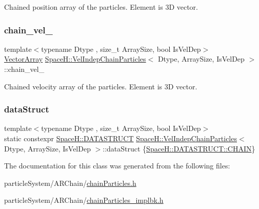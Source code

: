 Chained position array of the particles. Element is 3D vector. 

\mbox{\label{class_space_h_1_1_vel_indep_chain_particles_a79106719ec89861a02086b0a52eced21}} 
\subsubsection{\texorpdfstring{chain\+\_\+vel\+\_\+}{chain\_vel\_}}
{\footnotesize\ttfamily template$<$typename Dtype , size\+\_\+t Array\+Size, bool Is\+Vel\+Dep$>$ \\
\mbox{\hyperlink{class_space_h_1_1_vel_indep_particles_aa9983058940249df8b00fa800e8cbad2}{Vector\+Array}} \mbox{\hyperlink{class_space_h_1_1_vel_indep_chain_particles}{Space\+H\+::\+Vel\+Indep\+Chain\+Particles}}$<$ Dtype, Array\+Size, Is\+Vel\+Dep $>$\+::chain\+\_\+vel\+\_\+\hspace{0.3cm}{\ttfamily [protected]}}



Chained velocity array of the particles. Element is 3D vector. 

\mbox{\label{class_space_h_1_1_vel_indep_chain_particles_acf17d83713bb3f519dc1323418343375}} 
\subsubsection{\texorpdfstring{data\+Struct}{dataStruct}}
{\footnotesize\ttfamily template$<$typename Dtype , size\+\_\+t Array\+Size, bool Is\+Vel\+Dep$>$ \\
static constexpr \mbox{\hyperlink{namespace_space_h_a4782f089179a3c269891f02482b072df}{Space\+H\+::\+D\+A\+T\+A\+S\+T\+R\+U\+CT}} \mbox{\hyperlink{class_space_h_1_1_vel_indep_chain_particles}{Space\+H\+::\+Vel\+Indep\+Chain\+Particles}}$<$ Dtype, Array\+Size, Is\+Vel\+Dep $>$\+::data\+Struct \{\mbox{\hyperlink{namespace_space_h_a4782f089179a3c269891f02482b072dfa014d2cf3cdc3af6f4f92c09190860e33}{Space\+H\+::\+D\+A\+T\+A\+S\+T\+R\+U\+C\+T\+::\+C\+H\+A\+IN}}\}\hspace{0.3cm}{\ttfamily [static]}}



The documentation for this class was generated from the following files\+:\begin{DoxyCompactItemize}
\item 
particle\+System/\+A\+R\+Chain/\mbox{\hyperlink{chain_particles_8h}{chain\+Particles.\+h}}\item 
particle\+System/\+A\+R\+Chain/\mbox{\hyperlink{chain_particles__implbk_8h}{chain\+Particles\+\_\+implbk.\+h}}\end{DoxyCompactItemize}
